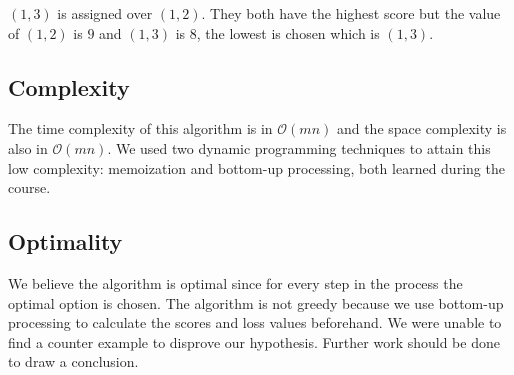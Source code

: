 \documentclass[paper=a4, fontsize=11pt]{scrartcl} %
\numberwithin{equation}{section} %
\numberwithin{figure}{section} %
\numberwithin{table}{section} %
\begin{document}
$(1,3)$ is assigned over $(1,2)$. They both have the highest score but the value of $(1,2)$ is $9$ and $(1,3)$ is $8$, the lowest is chosen which is $(1,3)$. 


\subsection{Complexity}

The time complexity of this algorithm is in $\mathcal{O}(mn)$ and the space complexity is also in $\mathcal{O}(mn)$.
We used two dynamic programming techniques to attain this low complexity: memoization and bottom-up processing, both learned during the course.

\subsection{Optimality}
We believe the algorithm is optimal since for every step in the process the optimal option is chosen.
The algorithm is not greedy because we use bottom-up processing to calculate the scores and loss values beforehand.
We were unable to find a counter example to disprove our hypothesis.
Further work should be done to draw a conclusion.
\end{document}
